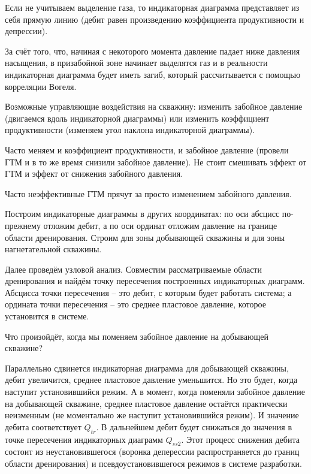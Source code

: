 \documentclass[main.tex]{subfiles}
\begin{document}
Если не учитываем выделение газа, то индикаторная диаграмма представляет из себя прямую линию (дебит равен произведению коэффициента продуктивности и депрессии).

За счёт того, что, начиная с некоторого момента давление падает ниже давления насыщения, в призабойной зоне начинает выделятся газ и в реальности индикаторная диаграмма будет иметь загиб, который рассчитывается с помощью корреляции Вогеля.

Возможные управляющие воздействия на скважину: изменить забойное давление (двигаемся вдоль индикаторной диаграммы) или изменить коэффициент продуктивности (изменяем угол наклона индикаторной диаграммы).

Часто меняем и коэффициент продуктивности, и забойное давление (провели ГТМ и в то же время снизили забойное давление). Не стоит смешивать эффект от ГТМ и эффект от снижения забойного давления.

Часто неэффективные ГТМ прячут за просто изменением забойного давления.


Построим индикаторные диаграммы в других координатах: по оси абсцисс по-прежнему отложим дебит, а по оси ординат отложим давление на границе области дренирования. Строим для зоны добывающей скважины и для зоны нагнетательной скважины.

Далее проведём узловой анализ. Совместим рассматриваемые области дренирования и найдём точку пересечения построенных индикаторных диаграмм. Абсцисса точки пересечения -- это дебит, с которым будет работать система; а ордината точки пересечения -- это среднее пластовое давление, которое установится в системе.


Что произойдёт, когда мы поменяем забойное давление на добывающей скважине?

Параллельно сдвинется индикаторная диаграмма для добывающей скважины, дебит увеличится, среднее пластовое давление уменьшится. Но это будет, когда наступит установившийся режим. А в момент, когда поменяли забойное давление на добывающей скважине, среднее пластовое давление остаётся практически неизменным (не моментально же наступит установившийся режим). И значение дебита соответствует $Q_{tr}$. В дальнейшем дебит будет снижаться до значения в точке пересечения индикаторных диаграмм $Q_{ss2}$. Этот процесс снижения дебита состоит из неустановившегося (воронка деперессии распространяется до границ области дренирования) и псевдоустановившегося режимов в системе разработки.
\end{document}
